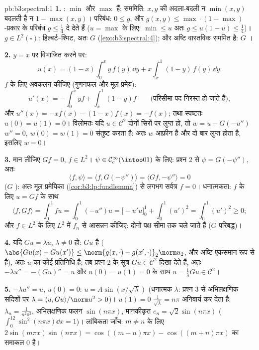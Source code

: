 \begin{solution}{pb:b3:spectral:1}
\textbf{1.} : $\min$ और $\max$  हैं; सममिति: $x, y$ की
अदला-बदली न $\min(x,y)$ बदलती है न $1 -
\max(x,y)$। परिबंध: $0 \leq g$, और $g(x,y) \leq
\max\cdot(1-\max)$-प्रकार
के परिबंध $g \leq \frac14$ दे देते हैं ($u
= \max$ के लिए: $\min \leq u$ अतः $g \leq u(1-u) \leq \frac14$)। $g
\in L^2(\square)$:
हिल्बर्ट--श्मिट, अतः $G$  (\cref{exo:b3:spectral:4}); और अष्टि वास्तविक सममित
है: $G$ ।

\textbf{2.} $y = x$ पर विभाजित करने पर:
\[
u(x) = (1 - x)\int_0^x y\,f(y)\,\dd y +
x\int_x^1(1 - y)\,f(y)\,\dd y .
\]
 $f$ के लिए अवकलन कीजिए (गुणनफल और मूल प्रमेय):
\[
u'(x) = -\int_0^xyf + \int_x^1(1-y)f
\qquad\text{(परिसीमा पद निरस्त हो जाते हैं)},
\]
और $u''(x) = -xf(x) - (1 - x)f(x) = -f(x)$; तथा स्पष्टतः $u(0) =
u(1) = 0$। विलोमतः यदि $u \in \mathcal C^2$ दोनों सिरों पर लुप्त
हो, तो $w = u - G(-u'')$ $w'' = 0$, $w(0) = w(1) =
0$ संतुष्ट करता है: अतः $w$ आफ़ीन है और दो
बार लुप्त होता है, इसलिए $w = 0$।

\textbf{3.} मान लीजिए $Gf = 0$, $f \in L^2$। $\psi \in \mathcal
C_c^\infty(\intoo01)$ के लिए: प्रश्न 2 से $\psi = G(-\psi'')$,
अतः
\[
\langle f, \psi\rangle = \langle f, G(-\psi'')\rangle
= \langle Gf, -\psi''\rangle = 0
\]
($G$ ): अतः मूल प्रमेयिका (\cref{cor:b3:lp:fundlemma}) से लगभग सर्वत्र $f = 0$।
धनात्मकता:  $f$ के लिए $u = Gf$ के साथ
\[
\langle f, Gf\rangle = \int_0^1 fu = \int_0^1(-u'')u
= \bigl[-u'u\bigr]_0^1 + \int_0^1(u')^2 = \int_0^1(u')^2
\geq 0 ;
\]
और $f \in L^2$ के लिए $L^2$ में  $f_n$ से आसन्नन कीजिए: दोनों पक्ष
सीमा तक चले जाते हैं ($G$ परिबद्ध)।

\textbf{4.} यदि $Gu = \lambda u$, $\lambda \neq 0$ हो: $Gu$  है ($\abs{Gu(x) - Gu(x')} \leq \norm{g(x,\cdot) -
g(x',\cdot)}_2\norm u_2$, और अष्टि
एकसमान रूप से  है), अतः $u$ का कोई  प्रतिनिधि है; तब प्रश्न
2 के सूत्र $Gu \in \mathcal C^2$ दिखा देते हैं, अतः $-\lambda u'' =
-(Gu)'' = u$ और $u(0) = u(1) = 0$ के साथ $u =
\frac1\lambda Gu \in \mathcal C^2$।

\textbf{5.} $-\lambda u'' = u$, $u(0) = 0$: $u = A\sin(x/\sqrt
\lambda)$ (धनात्मक $\lambda$: प्रश्न 3 से अभिलक्षणिक
सदिशों पर $\lambda =
\langle u, Gu\rangle/\norm u^2 > 0$)। $u(1) =
0$ $\frac1{\sqrt\lambda} = n\pi$ अनिवार्य कर देता है: $\lambda_n =
\frac1{n^2\pi^2}$, अभिलक्षणिक
फलन $\sin(n\pi x)$, मानकीकृत $e_n = \sqrt2\sin(n\pi x)$ ($\int_0^12\sin^2(n\pi x)\dd x =
1$)। लांबिकता जाँच: $m
\neq n$ के लिए $2\sin(m\pi x)\sin(n\pi x) =
\cos((m-n)\pi x) - \cos((m+n)\pi x)$
का समाकल $0$ है।


\end{solution}
